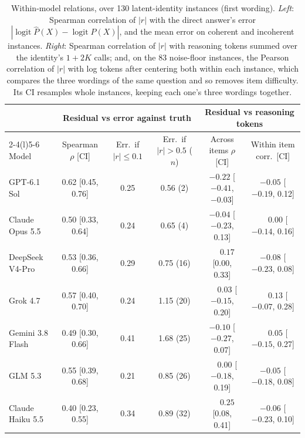 \documentclass[11pt]{article}
\newcommand{\phat}{\hat{P}}
\newcommand{\logit}{\operatorname{logit}}
\begin{document}
\begin{table}[t]
\centering\footnotesize
\setlength{\tabcolsep}{3pt}
\begin{tabular}{@{}lccccc@{}}
\toprule
 & \multicolumn{3}{c}{Residual vs error against truth} & \multicolumn{2}{c}{Residual vs reasoning tokens} \\
\cmidrule(lr){2-4}\cmidrule(l){5-6}
Model & Spearman $\rho$ [CI] & Err.\ if $|r|\le0.1$ & Err.\ if $|r|>0.5$ ($n$) & Across items $\rho$ [CI] & Within item corr.\ [CI] \\
\midrule
GPT-6.1 Sol      & 0.62 [0.45, 0.76] & 0.25 & 0.56 (2)  & $-0.22$ [$-0.41$, $-0.03$] & $-0.05$ [$-0.19$, 0.12] \\
Claude Opus 5.5  & 0.50 [0.33, 0.64] & 0.24 & 0.65 (4)  & $-0.04$ [$-0.23$, 0.13] & $\phantom{-}0.00$ [$-0.14$, 0.16] \\
DeepSeek V4-Pro  & 0.53 [0.36, 0.66] & 0.29 & 0.75 (16) & $\phantom{-}0.17$ [0.00, 0.33] & $-0.08$ [$-0.23$, 0.08] \\
Grok 4.7         & 0.57 [0.40, 0.70] & 0.24 & 1.15 (20) & $\phantom{-}0.03$ [$-0.15$, 0.20] & $\phantom{-}0.13$ [$-0.07$, 0.28] \\
Gemini 3.8 Flash & 0.49 [0.30, 0.66] & 0.41 & 1.68 (25) & $-0.10$ [$-0.27$, 0.07] & $\phantom{-}0.05$ [$-0.15$, 0.27] \\
GLM 5.3          & 0.55 [0.39, 0.68] & 0.21 & 0.85 (26) & $\phantom{-}0.00$ [$-0.18$, 0.19] & $-0.05$ [$-0.18$, 0.08] \\
Claude Haiku 5.5 & 0.40 [0.23, 0.55] & 0.34 & 0.89 (32) & $\phantom{-}0.25$ [0.08, 0.41] & $-0.06$ [$-0.23$, 0.10] \\
\bottomrule
\end{tabular}
\caption{Within-model relations, over 130 latent-identity instances (first wording). \emph{Left}: Spearman correlation of $|r|$ with the direct answer's error $|\logit\phat(X)-\logit P(X)|$, and the mean error on coherent and incoherent instances. \emph{Right}: Spearman correlation of $|r|$ with reasoning tokens summed over the identity's $1+2K$ calls; and, on the 83 noise-floor instances, the Pearson correlation of $|r|$ with log tokens after centering both within each instance, which compares the three wordings of the same question and so removes item difficulty. Its CI resamples whole instances, keeping each one's three wordings together.}
\label{tab:within}
\end{table}
\end{document}
